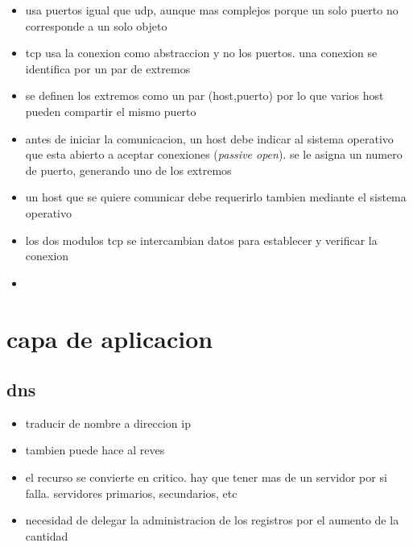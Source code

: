 \documentclass[11pt]{article}
\begin{document}
\begin{itemize}
\item usa puertos igual que udp, aunque mas complejos porque un solo puerto no corresponde a un solo objeto
\item tcp usa la conexion como abstraccion y no los puertos. una conexion se identifica por un par de extremos
\item se definen los extremos como un par (host,puerto) por lo que varios host pueden compartir el mismo puerto
\item antes de iniciar la comunicacion, un host debe indicar al sistema operativo que esta abierto a aceptar conexiones (\emph{passive open}). se le asigna un numero de puerto, generando uno de los extremos
\item un host que se quiere comunicar debe requerirlo tambien mediante el sistema operativo
\item los dos modulos tcp se intercambian datos para establecer y verificar la conexion
\item 
\end{itemize}
\section{capa de aplicacion}
\label{sec:orgb7f983c}
\subsection{dns}
\label{sec:org30b88ee}
\begin{itemize}
\item traducir de nombre a direccion ip
\item tambien puede hace al reves
\item el recurso se convierte en critico. hay que tener mas de un servidor por si falla. servidores primarios, secundarios, etc
\item necesidad de delegar la administracion de los registros por el aumento de la cantidad
\end{itemize}
\end{document}
